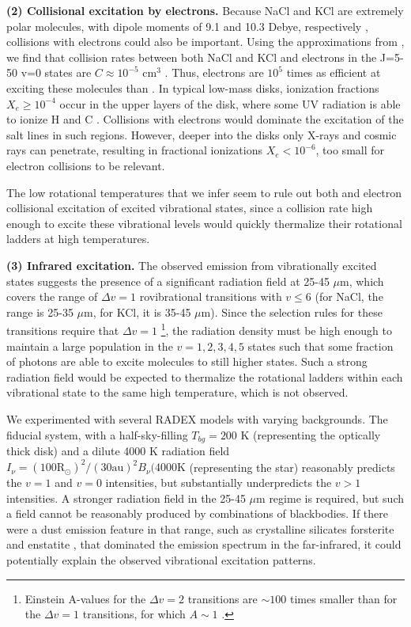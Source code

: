 \documentclass[12pt]{article}
\newcommand{\um}{\ensuremath{\mu \textrm{m}}\xspace}    %
\begin{document}
\par{\textbf{(2) Collisional excitation by electrons.}} 
Because NaCl and KCl are extremely polar molecules, with dipole moments of 9.1
and 10.3 Debye, respectively \cite{Barton2014a}, collisions with electrons
could also be important.  Using the approximations from \cite{Dickinson1975a},
we find that collision rates between both NaCl and KCl and electrons in the
J=5-50 v=0 states are $C\approx10^{-5}$ cm$^{3}$ \pers.  Thus, electrons are
$10^5$ times as efficient at exciting these molecules than \hh. In typical
low-mass disks, ionization fractions $X_e \geq 10^{-4}$ occur in the upper
layers of the disk, where some UV radiation is able to ionize H and C
\cite{Bergin2007a}.  Collisions with electrons would dominate the excitation
of the salt lines in such regions.  However, deeper into the disks only X-rays
and cosmic rays can penetrate, resulting in fractional ionizations $X_e <
10^{-6}$, too small for electron collisions to be relevant. 

The low rotational temperatures that we infer seem to rule out both \hh and
electron collisional excitation of excited vibrational states, since a
collision rate high enough to excite these vibrational levels would quickly
thermalize their rotational ladders at high temperatures.


\par{\textbf{(3) Infrared excitation.}} 
The observed emission from vibrationally excited states suggests the
presence of a significant radiation field at 25-45 \um, which covers the range
of $\Delta v=1$ rovibrational transitions with $v\leq6$ (for NaCl, the range is
25-35 \um, for KCl, it is 35-45 \um).  Since the selection rules for these
transitions require that $\Delta v=1$ \footnote{Einstein A-values for the 
$\Delta v=2$ transitions are $\sim100$ times smaller than for the $\Delta v=1$
transitions, for which $A\sim1$ \pers.}, the radiation density must be high
enough to maintain a large population in the $v=1,
2, 3, 4, 5$ states such that some fraction of photons are able to excite
molecules to still higher states.  Such a strong radiation field would
be expected to thermalize the rotational ladders within each vibrational
state to the same high temperature, which is not observed.

We experimented with several RADEX models with varying backgrounds.  The
fiducial system, with a half-sky-filling $T_{bg}=200$ K (representing the
optically thick disk) and a dilute 4000 K radiation field $I_{\nu} = (100
\mathrm{R_\odot})^2 / (30 \mathrm{au})^2 B_\nu(4000 \mathrm{K}$ (representing
the star) reasonably predicts the $v=1$ and $v=0$ intensities, but
substantially underpredicts the $v>1$ intensities.  A stronger radiation
field in the 25-45 \um regime is required, but such a field cannot be
reasonably produced by combinations of blackbodies.  If there were a dust
emission feature in that range, such as crystalline silicates forsterite
and enstatite \cite[e.g.][]{Molster2005a}, that dominated the emission spectrum
in the far-infrared, it could potentially explain the observed vibrational
excitation patterns.
\end{document}
